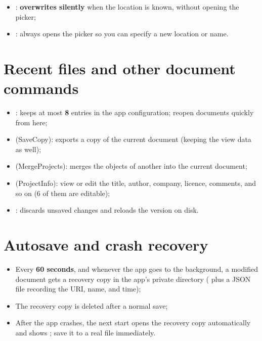 \begin{tip}
\begin{itemize}
  \item {}: \textbf{overwrites silently} when the location is known, without opening the picker;
  \item {}: always opens the picker so you can specify a new location or name.
\end{itemize}
\end{tip}

\section{Recent files and other document commands}

\begin{itemize}
  \item {}: keeps at most \textbf{8} entries in the app configuration; reopen documents quickly from here;
  \item {} (SaveCopy): exports a copy of the current document (keeping the view data as well);
  \item {} (MergeProjects): merges the objects of another  into the current document;
  \item {} (ProjectInfo): view or edit the title, author, company, licence, comments, and so on
        (6 of them are editable);
  \item {}: discards unsaved changes and reloads the version on disk.
\end{itemize}

\section{Autosave and crash recovery}

\begin{itemize}
  \item Every \textbf{60 seconds}, and whenever the app goes to the background, a modified document gets a recovery
        copy in the app's private directory  ( plus a JSON file recording
        the URI, name, and time);
  \item The recovery copy is deleted after a normal save;
  \item After the app crashes, the next start opens the recovery copy automatically and shows
        ; save it to a real file immediately.
\end{itemize}

